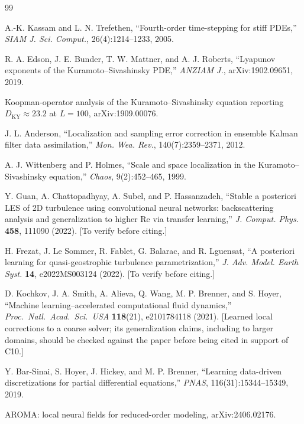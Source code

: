 \documentclass[11pt]{article}
\begin{document}
\begin{thebibliography}{99}

 A.-K. Kassam and L. N. Trefethen, ``Fourth-order
time-stepping for stiff PDEs,'' \emph{SIAM J. Sci. Comput.}, 26(4):1214--1233, 2005.

 R. A. Edson, J. E. Bunder, T. W. Mattner, and A. J.
Roberts, ``Lyapunov exponents of the Kuramoto--Sivashinsky PDE,''
\emph{ANZIAM J.}, arXiv:1902.09651, 2019.

 Koopman-operator analysis of the
Kuramoto--Sivashinsky equation reporting $D_{\mathrm{KY}}\approx 23.2$
at $L=100$, arXiv:1909.00076.

 J. L. Anderson, ``Localization and
sampling error correction in ensemble Kalman filter data
assimilation,'' \emph{Mon. Wea. Rev.}, 140(7):2359--2371, 2012.

 A. J. Wittenberg and P. Holmes, ``Scale and
space localization in the Kuramoto--Sivashinsky equation,''
\emph{Chaos}, 9(2):452--465, 1999.

 Y. Guan, A. Chattopadhyay, A. Subel, and P. Hassanzadeh, ``Stable a posteriori LES of 2D turbulence using convolutional neural networks: backscattering analysis and generalization to higher Re via transfer learning,'' \emph{J. Comput. Phys.} \textbf{458}, 111090 (2022). [To verify before citing.]

 H. Frezat, J. Le Sommer, R. Fablet, G. Balarac, and R. Lguensat, ``A posteriori learning for quasi-geostrophic turbulence parametrization,'' \emph{J. Adv. Model. Earth Syst.} \textbf{14}, e2022MS003124 (2022). [To verify before citing.]

 D. Kochkov, J. A. Smith, A. Alieva, Q. Wang, M. P. Brenner, and S. Hoyer, ``Machine learning--accelerated computational fluid dynamics,'' \emph{Proc.\ Natl.\ Acad.\ Sci.\ USA} \textbf{118}(21), e2101784118 (2021). [Learned local corrections to a coarse solver; its generalization claims, including to larger domains, should be checked against the paper before being cited in support of C10.]

 Y. Bar-Sinai, S. Hoyer, J. Hickey, and M. P.
Brenner, ``Learning data-driven discretizations for partial
differential equations,'' \emph{PNAS}, 116(31):15344--15349, 2019.

 AROMA: local neural fields for reduced-order
modeling, arXiv:2406.02176.


\end{thebibliography}
\end{document}
